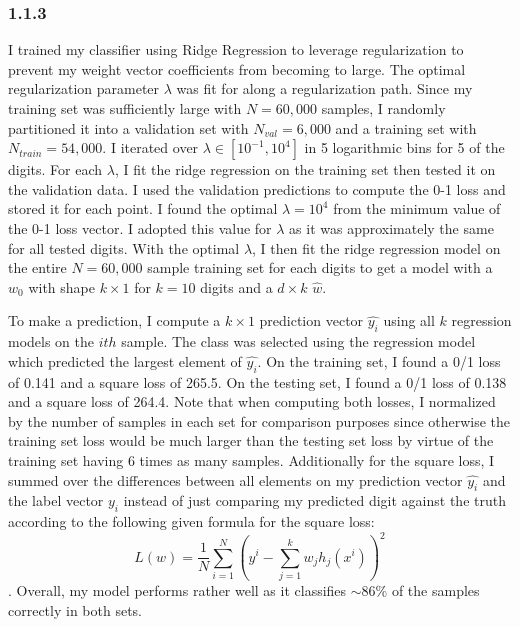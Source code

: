 \documentclass[12pt]{amsart}
\begin{document}
\subsubsection*{1.1.3}

I trained my classifier using Ridge Regression to leverage regularization to prevent my weight vector coefficients from becoming to large.  The optimal regularization parameter $\lambda$ was fit for along a regularization path.  Since my training set was sufficiently large with $N = 60,000$ samples, I randomly partitioned it into a validation set with $N_{val} = 6,000$ and a training set with $N_{train} = 54,000$.  I iterated over $\lambda \in [10^{-1},10^{4}]$ in 5 logarithmic bins for 5 of the digits.  For each $\lambda$, I fit the ridge regression on the training set then tested it on the validation data.  I used the validation predictions to compute the 0-1 loss and stored it for each point.  I found the optimal $\lambda = 10^4$ from the minimum value of the 0-1 loss vector.  I adopted this value for $\lambda$ as it was approximately the same for all tested digits.  With the optimal $\lambda$, I then fit the ridge regression model on the entire $N = 60,000$ sample training set for each digits to get a model with a $w_0$ with shape $k \times 1$ for $k = 10$ digits and a $d \times k$ $\hat{w}$.  

To make a prediction, I compute a $k \times 1$ prediction vector $\hat{y_i}$ using all $k$ regression models on the $ith$ sample.  The class was selected using the regression model which predicted the largest element of $\hat{y_i}$.  On the training set, I found a 0/1 loss of 0.141 and a square loss of 265.5.  On the testing set, I found a 0/1 loss of 0.138 and a square loss of 264.4.  Note that when computing both losses, I normalized by the number of samples in each set for comparison purposes since otherwise the training set loss would be much larger than the testing set loss by virtue of the training set having 6 times as many samples.  Additionally for the square loss, I summed over the differences between all elements on my prediction vector $\hat{y_i}$ and the label vector $y_i$ instead of just comparing my predicted digit against the truth according to the following given formula for the square loss:
\begin{equation} \label{eqn:square_loss}
L(w) = \frac{1}{N} \sum_{i = 1}^N \left(y^i - \sum_{j = 1}^k w_j h_j(x^i)  \right)^2
\end{equation}.  
Overall, my model performs rather well as it classifies ${\sim}86\%$ of the samples correctly in both sets.
\end{document}

